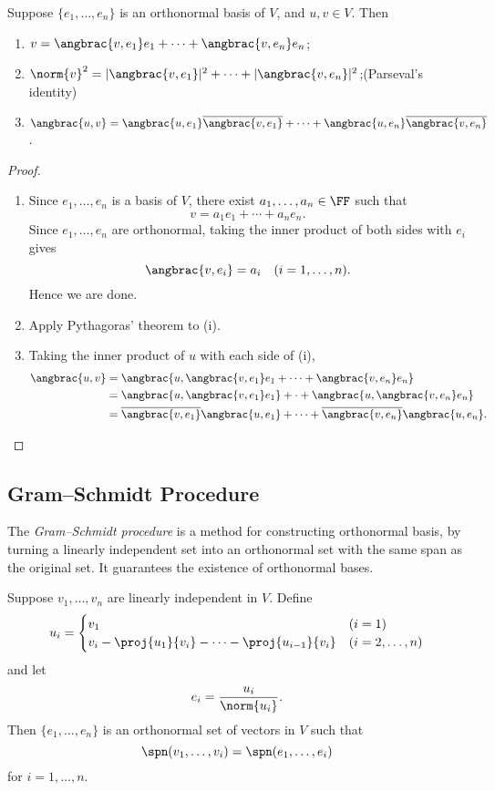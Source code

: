 \begin{lemma}
Suppose $\{e_1,\dots,e_n\}$ is an orthonormal basis of $V$, and $u,v\in V$. Then
\begin{enumerate}[label=(\roman*)]
\item $v=\angbrac{v,e_1}e_1+\cdots+\angbrac{v,e_n}e_n$;
\item $\norm{v}^2=|\angbrac{v,e_1}|^2+\cdots+|\angbrac{v,e_n}|^2$;\hfill(Parseval's identity)
\item $\angbrac{u,v}=\angbrac{u,e_1}\overline{\angbrac{v,e_1}}+\cdots+\angbrac{u,e_n}\overline{\angbrac{v,e_n}}$.
\end{enumerate}
\end{lemma}

\begin{proof} \
\begin{enumerate}[label=(\roman*)]
\item Since $e_1,\dots,e_n$ is a basis of $V$, there exist $a_1,\dots,a_n\in\FF$ such that
\[v=a_1e_1+\cdots+a_ne_n.\]
Since $e_1,\dots,e_n$ are orthonormal, taking the inner product of both sides with $e_i$ gives
\[\angbrac{v,e_i}=a_i\quad(i=1,\dots,n).\]
Hence we are done.
\item Apply Pythagoras' theorem to (i).
\item Taking the inner product of $u$ with each side of (i),
\begin{align*}
\angbrac{u,v}&=\angbrac{u,\angbrac{v,e_1}e_1+\cdots+\angbrac{v,e_n}e_n}\\
&=\angbrac{u,\angbrac{v,e_1}e_1}+\cdot+\angbrac{u,\angbrac{v,e_n}e_n}\\
&=\overline{\angbrac{v,e_1}}\angbrac{u,e_1}+\cdots+\overline{\angbrac{v,e_n}}\angbrac{u,e_n}.
\end{align*}
\end{enumerate}
\end{proof}

\subsection{Gram--Schmidt Procedure}
The \emph{Gram--Schmidt procedure} is a method for constructing orthonormal basis, by turning a linearly independent set into an orthonormal set with the same span as the original set. It guarantees the existence of orthonormal bases.

\begin{theorem}
Suppose $v_1,\dots,v_n$ are linearly independent in $V$. Define
\[u_i=\begin{cases}
v_1&(i=1)\\
v_i-\proj{u_1}{v_i}-\cdots-\proj{u_{i-1}}{v_i}&(i=2,\dots,n)
\end{cases}\]
and let
\[e_i=\frac{u_i}{\norm{u_i}}.\]
Then $\{e_1,\dots,e_n\}$ is an orthonormal set of vectors in $V$ such that
\[\spn(v_1,\dots,v_i)=\spn(e_1,\dots,e_i)\]
for $i=1,\dots,n$.
\end{theorem}

